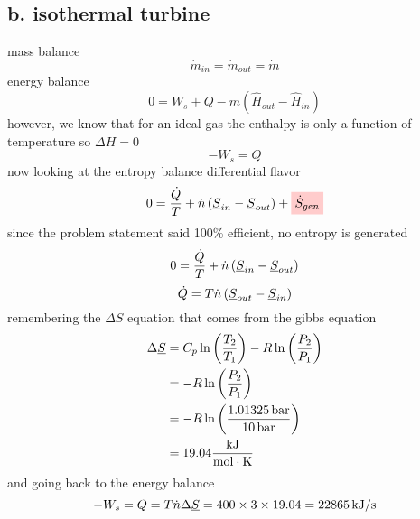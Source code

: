 \documentclass{article}
\begin{document}
\subsection*{b. isothermal turbine}
\begin{center}
\end{center}
mass balance
\[ \dot{m}_{in} = \dot{m}_{out} = \dot{m} \]
energy balance
\[  0 = W_s + Q - m\left(\hat{H}_{out} - \hat{H}_{in}\right)  \]
however, we know that for an ideal gas the enthalpy is only a function of temperature so $\Delta H = 0$ 
\[  -W_s = Q  \]
now looking at the entropy balance {\scriptsize differential flavor}
\[ 0 = \frac{\dot{Q}}{T} + \dot{n}\left(\ub{S}_{in} - \ub{S}_{out}\right) + \highlight{red}{\dot{S}_{gen}} \]
since the problem statement said 100\% efficient, no entropy is generated
\[ 0 = \frac{\dot{Q}}{T} + \dot{n}\left(\underbar{$S$}_{in} - \underbar{$S$}_{out}\right)  \]
\[ \dot{Q} = T \dot{n} \left(\underbar{$S$}_{out} - \underbar{$S$}_{in}\right) \]
remembering the $\Delta S$ equation that comes from the gibbs equation
\begin{align*}
    \Delta \underbar{$S$} &= C_p \ln\left(\frac{T_2}{T_1}\right) - R \ln\left(\frac{P_2}{P_1}\right) \\
     &= - R \ln\left(\frac{P_2}{P_1}\right) \\
     &= - R \ln\left(\frac{1.01325\,\text{bar}}{10\,\text{bar}}\right) \\
    &= 19.04 \frac{\text{kJ}}{\text{mol}\cdot\text{K}}
\end{align*}
and going back to the energy balance
\[ -W_s = Q = T \dot{n} \Delta \underbar{$S$} = 400 \times 3 \times 19.04 = 22865\,\text{kJ/s} \]
\end{document}
